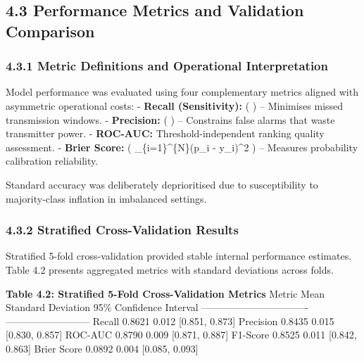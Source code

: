 \subsection{4.3 Performance Metrics and Validation
Comparison}\label{performance-metrics-and-validation-comparison}

\subsubsection{4.3.1 Metric Definitions and Operational
Interpretation}\label{metric-definitions-and-operational-interpretation}

Model performance was evaluated using four complementary metrics aligned
with asymmetric operational costs: - \textbf{Recall (Sensitivity):} (
 ) -- Minimises missed transmission windows. -
\textbf{Precision:} (  ) -- Constrains false alarms
that waste transmitter power. - \textbf{ROC-AUC:} Threshold-independent
ranking quality assessment. - \textbf{Brier Score:} (
\sum\_\{i=1\}\^{}\{N\}(p\_i - y\_i)\^{}2 ) -- Measures
probability calibration reliability.

Standard accuracy was deliberately deprioritised due to susceptibility
to majority-class inflation in imbalanced settings.

\subsubsection{4.3.2 Stratified Cross-Validation
Results}\label{stratified-cross-validation-results}

Stratified 5-fold cross-validation provided stable internal performance
estimates. Table 4.2 presents aggregated metrics with standard
deviations across folds.

\textbf{Table 4.2: Stratified 5-Fold Cross-Validation Metrics}
\textbar{} Metric \textbar{} Mean \textbar{} Standard Deviation
\textbar{} 95\% Confidence Interval \textbar{}
\textbar--------\textbar------\textbar-------------------\textbar--------------------------\textbar{}
\textbar{} Recall \textbar{} 0.8621 \textbar{} 0.012 \textbar{}
{[}0.851, 0.873{]} \textbar{} \textbar{} Precision \textbar{} 0.8435
\textbar{} 0.015 \textbar{} {[}0.830, 0.857{]} \textbar{} \textbar{}
ROC-AUC \textbar{} 0.8790 \textbar{} 0.009 \textbar{} {[}0.871, 0.887{]}
\textbar{} \textbar{} F1-Score \textbar{} 0.8525 \textbar{} 0.011
\textbar{} {[}0.842, 0.863{]} \textbar{} \textbar{} Brier Score
\textbar{} 0.0892 \textbar{} 0.004 \textbar{} {[}0.085, 0.093{]}
\textbar{}

